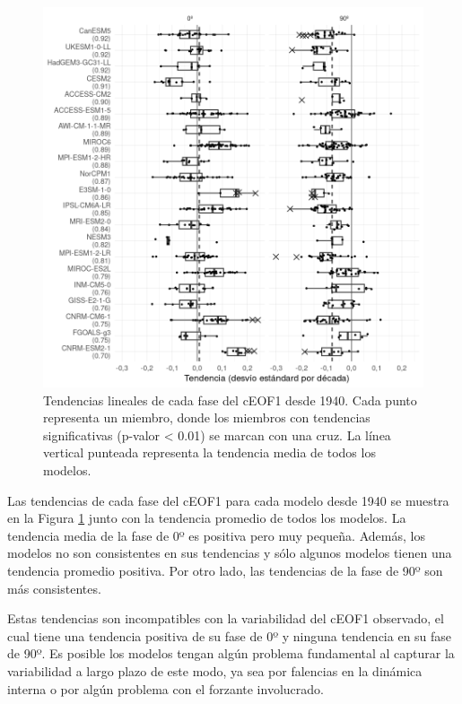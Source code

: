 \documentclass[12pt,oneside,a4paper]{reedthesis}
\begin{document}
\begin{figure}

{\centering \includegraphics{figures/50-cmip6/trends-ceof1-1} 

}

\caption{Tendencias lineales de cada fase del cEOF1 desde 1940. Cada punto representa un miembro, donde los miembros con tendencias significativas (p-valor \textless{} 0.01) se marcan con una cruz. La línea vertical punteada representa la tendencia media de todos los modelos.}\label{fig:trends-ceof1}
\end{figure}



Las tendencias de cada fase del cEOF1 para cada modelo desde 1940 se muestra en la Figura \ref{fig:trends-ceof1} junto con la tendencia promedio de todos los modelos.
La tendencia media de la fase de 0º es positiva pero muy pequeña.
Además, los modelos no son consistentes en sus tendencias y sólo algunos modelos tienen una tendencia promedio positiva.
Por otro lado, las tendencias de la fase de 90º son más consistentes.

Estas tendencias son incompatibles con la variabilidad del cEOF1 observado, el cual tiene una tendencia positiva de su fase de 0º y ninguna tendencia en su fase de 90º.
Es posible los modelos tengan algún problema fundamental al capturar la variabilidad a largo plazo de este modo, ya sea por falencias en la dinámica interna o por algún problema con el forzante involucrado.
\end{document}
